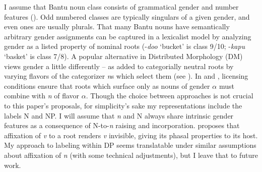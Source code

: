\documentclass[output=paper
,modfonts
,nonflat]{langsci/langscibook}
\begin{document}
I assume that Bantu noun class consists of grammatical gender and number features (\citealt{Corbett1991,Carstens1991}). Odd numbered classes are typically singulars of a given gender, and even ones are usually plurals. That many Bantu nouns have semantically arbitrary gender assignments can be captured in a lexicalist model by analyzing gender as a listed property of nominal roots (-\textit{doo} `bucket' is class 9/10; -\textit{kapu} `basket' is class 7/8). A popular alternative in Distributed Morphology (DM) views gender a little differently -- as added to categorially neutral roots by varying flavors of the categorizer \textit{n}s which select them (see \citealt{Lecarme2002,Ferrari2005,Kihm2005,Acquaviva2009,Kramer2015}). In \citet{Acquaviva2009} and \citet{Kramer2015}, licensing conditions ensure that roots which surface only as nouns of gender $\alpha$ must combine with \textit{n} of flavor $\alpha$.  
Though the choice between approaches is not crucial to this paper's proposals, for simplicity's sake my representations include the labels N and NP. I will assume that \textit{n} and N always share intrinsic gender features as a consequence of N-to-\textit{n} raising and incorporation. \citet{Chomsky2015} proposes that affixation of \textit{v} to a root renders \textit{v} invisible, giving its phasal properties to its host. My approach to labeling within DP seems translatable under similar assumptions about affixation of \textit{n} (with some technical adjustments), but I leave that to future work. 
\end{document}
